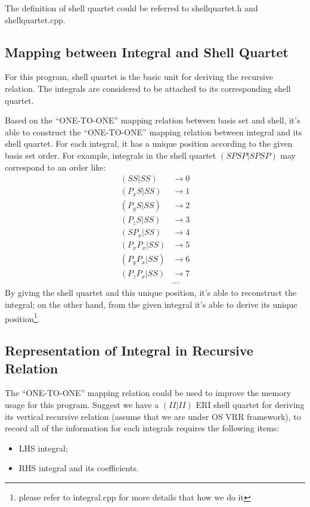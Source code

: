 The definition of shell quartet could be referred to shellquartet.h
and shellquartet.cpp.

\subsection{Mapping between Integral and Shell Quartet}

For this program, shell quartet is the basic unit for deriving the 
recursive relation. The integrals are considered to be attached to 
its corresponding shell quartet.

Based on the ``ONE-TO-ONE'' mapping relation between basis set 
and shell, it's able to construct the ``ONE-TO-ONE'' mapping relation
between integral and its shell quartet. For each integral, it 
has a unique position according to the given basis set order.
For example, integrals in the shell quartet $(SPSP|SPSP)$ may 
correspond to an order like:
\begin{align}
 (SS|SS)         &\rightarrow  0 \nonumber \\
 (P_{x}S|SS)     &\rightarrow  1 \nonumber \\
 (P_{y}S|SS)     &\rightarrow  2 \nonumber \\
 (P_{z}S|SS)     &\rightarrow  3 \nonumber \\
 (SP_{x}|SS)     &\rightarrow  4 \nonumber \\
 (P_{x}P_{x}|SS) &\rightarrow  5 \nonumber \\
 (P_{y}P_{x}|SS) &\rightarrow  6 \nonumber \\
 (P_{z}P_{x}|SS) &\rightarrow  7 \nonumber \\
                 &\cdots
\end{align}
By giving the shell quartet and this unique position, it's able 
to reconstruct the integral; on the other hand, from the given 
integral it's able to derive its unique position\footnote{please
refer to integral.cpp for more details that how we do it}.

\subsection{Representation of Integral in Recursive Relation}
%
%
\label{representation_integral_sq}

The ``ONE-TO-ONE'' mapping relation could be used to improve the memory 
usage for this program. Suggest we have a $(II|II)$ ERI shell 
quartet for deriving its vertical recursive relation (assume
that we are under OS VRR framework), to record
all of the information for each integrals requires the following 
items:
\begin{itemize}
 \item LHS integral;
 \item RHS integral and its coefficients.
\end{itemize}

